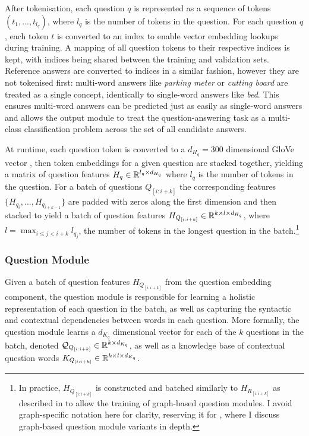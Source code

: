 After tokenisation, each question \(q\) is represented as a sequence of tokens \((t_1, ..., t_{l_q})\), where \(l_q\) is the number of tokens in the question. For each question \(q\), each  token \(t\) is converted to an index to enable vector embedding lookups during training. A mapping of all question tokens to their respective indices is kept, with indices being shared between the training and validation sets. Reference answers are converted to indices in a similar fashion, however they are not tokenised first: multi-word answers like \textit{parking meter} or \textit{cutting board} are treated as a single concept, identically to single-word answers like \textit{bed}. This ensures  multi-word answers can be predicted just as easily as single-word answers and allows the output module to treat the question-answering task as a multi-class classification problem across the set of all candidate answers.

At runtime, each question token is converted to a \(d_{H_q} = 300\) dimensional GloVe vector \cite{pennington2014glove}, then token embeddings for a given question are stacked together, yielding a matrix of question features \(H_q \in \mathbb{R}^{l_q \times d_{H_q}}\) where \(l_q\) is the number of tokens in the question. For a batch of questions \(Q_{[i:i+k]}\) the corresponding features \(\{H_{q_i}, ..., H_{q_{i+k-1}}\}\) are padded with zeros along the first dimension and then stacked to yield a batch of question features \(H_{Q_{[i:i+k]}} \in \mathbb{R}^{k \times l \times d_{H_q}}\), where \(l = \max_{i \leq j < i+k} l_{q_j}\), the number of tokens in the longest question in the batch.\footnote{In practice, \(H_{Q_{[i:i+k]}}\) is constructed and batched similarly to \(H_{R_{[i:i+k]}}\) as described in \subsectionautorefname{ \ref{sec:scene_graph_embedding_details}} to allow the training of graph-based question modules. I avoid graph-specific notation here for clarity, reserving it for \subsectionautorefname{ \ref{subsec:question_module_ablations}}, where I discuss graph-based question module variants in depth.}

\subsubsection{Question Module}

Given a batch of question features \(H_{Q_{[i:i+k]}}\) from the question embedding component, the question module is responsible for learning a holistic representation of each question in the batch, as well as capturing the syntactic and contextual dependencies between words in each question. More formally, the question module learns a  \(d_{K_q}\) dimensional vector for each of the \(k\) questions in the batch, denoted \(\mathcal{Q}_{Q_{[i:i+k]}} \in \mathbb{R}^{k \times d_{K_q}}\), as well as a knowledge base of contextual question words \(K_{Q_{[i:i+k]}} \in \mathbb{R}^{k \times l \times d_{K_q}}\).

